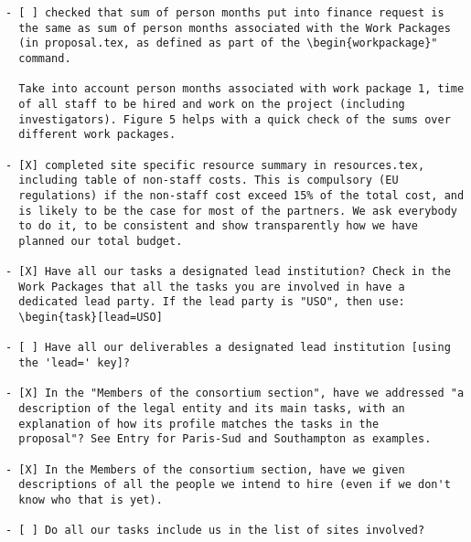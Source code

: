 \begin{draft}
\vspace{1cm}

\begin{verbatim}
- [ ] checked that sum of person months put into finance request is
  the same as sum of person months associated with the Work Packages
  (in proposal.tex, as defined as part of the \begin{workpackage}"
  command.
  
  Take into account person months associated with work package 1, time
  of all staff to be hired and work on the project (including
  investigators). Figure 5 helps with a quick check of the sums over
  different work packages.

- [X] completed site specific resource summary in resources.tex,
  including table of non-staff costs. This is compulsory (EU
  regulations) if the non-staff cost exceed 15% of the total cost, and
  is likely to be the case for most of the partners. We ask everybody
  to do it, to be consistent and show transparently how we have
  planned our total budget.

- [X] Have all our tasks a designated lead institution? Check in the
  Work Packages that all the tasks you are involved in have a
  dedicated lead party. If the lead party is "USO", then use:
  \begin{task}[lead=USO]

- [ ] Have all our deliverables a designated lead institution [using
  the 'lead=' key]?

- [X] In the "Members of the consortium section", have we addressed "a
  description of the legal entity and its main tasks, with an
  explanation of how its profile matches the tasks in the
  proposal"? See Entry for Paris-Sud and Southampton as examples.

- [X] In the Members of the consortium section, have we given
  descriptions of all the people we intend to hire (even if we don't
  know who that is yet). 
  
- [ ] Do all our tasks include us in the list of sites involved?
\end{verbatim}
\end{draft}





